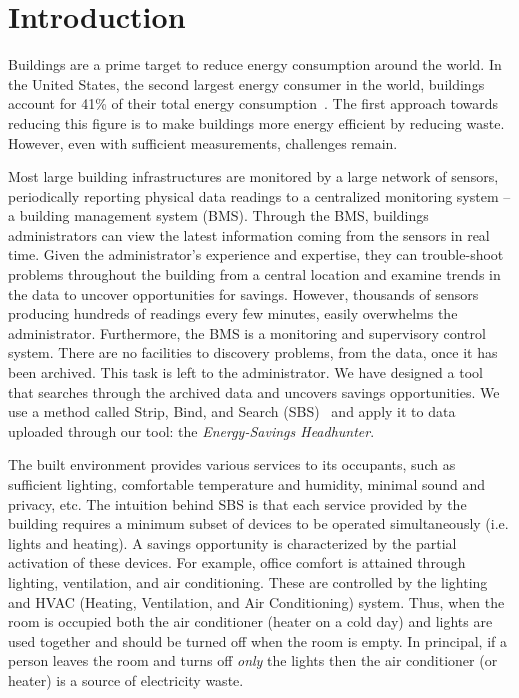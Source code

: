 \section{Introduction}
Buildings are a prime target to reduce energy consumption around the world.
In the United States, the second largest energy consumer in the world, buildings account for 
41\% of their total energy consumption~\cite{aer2011}.
The first approach towards reducing this figure is to make buildings more energy efficient
by reducing waste.  However, even with sufficient measurements, challenges remain.

Most large building infrastructures are monitored by a large network of sensors, periodically
reporting physical data readings to a centralized monitoring system -- a building management system (BMS).
Through the BMS, buildings administrators can view the latest information coming from the sensors in real time.
Given the administrator's experience and expertise, they can trouble-shoot problems throughout the building
from a central location and examine trends in the data to uncover opportunities for savings.
However, thousands of sensors producing hundreds of readings every few minutes, easily overwhelms
the administrator.  Furthermore, the BMS is a monitoring and supervisory control system.  There
are no facilities to discovery problems, from the data, once it has been archived.  This task is left to the administrator.
We have designed a tool that searches through the archived data and uncovers savings opportunities.  We
use a method called Strip, Bind, and Search (SBS)~\cite{sbs:ipsn2013} and apply it to data uploaded through our tool: 
the \emph{Energy-Savings Headhunter}.

The built environment provides various services to its occupants, such as sufficient 
lighting, comfortable temperature and humidity, minimal sound and privacy, etc.
The intuition behind SBS is that each service provided by the building requires a minimum subset of devices to be operated
simultaneously (i.e. lights and heating).  A savings opportunity is characterized by the partial activation of these devices.
For example, office comfort is attained through lighting, ventilation, and air conditioning.
These are controlled by the lighting and HVAC (Heating, Ventilation, and Air Conditioning) system.
Thus, when the room is occupied both the air conditioner (heater on a cold day) and lights are used together and should be turned off 
when the room is empty.
In principal, if a person leaves the room and turns off \emph{only} the lights then the air conditioner (or heater) is a source of electricity waste.

